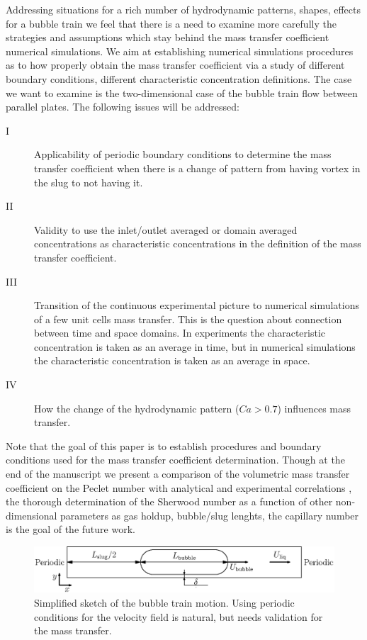 \documentclass{article}
\begin{document}
Addressing situations for a rich number of hydrodynamic patterns, shapes, effects for a bubble
train we feel that there is a need to examine more carefully the strategies and assumptions which
stay behind the mass transfer coefficient numerical simulations. We aim at establishing
numerical simulations procedures as to how properly obtain the mass transfer coefficient via a study of different boundary conditions, different characteristic concentration definitions. The case we want to examine is the two-dimensional case of the bubble train flow between parallel plates. The following issues will be addressed:
\begin{description}
\item[I] Applicability of periodic boundary conditions to determine the mass transfer coefficient when there is a change of pattern from having vortex in the slug to not having it. 
\item[II] Validity to use the inlet/outlet averaged or domain averaged concentrations as characteristic concentrations in the definition of the mass transfer coefficient.
\item[III] Transition of the continuous experimental picture to numerical simulations of a few unit cells mass transfer. This is the question about connection between time and space domains. In experiments the characteristic concentration is taken as an average in time, but in numerical simulations \cite{vanbaten-circular} the characteristic concentration is taken as an average in space.
\item[IV] How the change of the hydrodynamic pattern ($Ca>0.7$) influences mass transfer.
\end{description}
Note that the goal of this paper is to establish procedures and boundary conditions used for the mass transfer coefficient determination. Though at the end of the manuscript we present a comparison of the volumetric mass transfer coefficient on the Peclet number with analytical \cite{irandoust} and experimental correlations \cite{yue-mass}, the thorough
determination of the Sherwood number as a function of
other non-dimensional parameters as gas holdup, bubble/slug lenghts, the capillary number is the goal of the future work.
\begin{figure}[htb!]
\includegraphics[width=\textwidth]{Figures/benchmark_hydro.eps}
\caption{Simplified sketch of the bubble train motion. Using periodic conditions for the velocity
field is natural, but needs validation for the mass transfer. \label{fig:benchmark:hydro}}
\end{figure}
\end{document}
